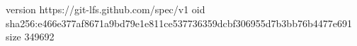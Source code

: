 version https://git-lfs.github.com/spec/v1
oid sha256:e466e377af8671a9bd79e1e811ce537736359dcbf306955d7b3bb76b4477e691
size 349692
